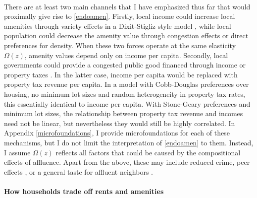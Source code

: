 \documentclass[12pt]{article}
\begin{document}
	 \paragraph*{}
	There are at least two main channels that I have emphasized thus far that would proximally give rise to \eqref{endoamen}. Firstly, local income could increase local amenities through variety effects in a Dixit-Stigliz style model \citep{AlmagroDI, Coutureetal}, while local population could decrease the amenity value through congestion effects or direct preferences for density. When these two forces operate at the same elasticity $\Omega(z)$, amenity values depend only on income per capita. Secondly, local governments could provide a congested public good financed through income or property taxes \citep{calabresetal, ineffTiebout}. In the latter case, income per capita would be replaced with property tax revenue per capita. In a model with Cobb-Douglas preferences over housing, no minimum lot sizes and random heterogeneity in property tax rates, this essentially identical to income per capita. With Stone-Geary preferences and minimum lot sizes, the relationship between property tax revenue and incomes need not be linear, but nevertheless they would still be highly correlated. In Appendix \ref{microfoundations}, I provide microfoundations for each of these mechanisms, but I do not limit the interpretation of \eqref{endoamen} to them. Instead, I assume $\Omega(z)$ reflects all factors that could be caused by the compositional effects of affluence. Apart from the above, these may include reduced crime, peer effects \citep{chettyhendren}, or a general taste for affluent neighbors \citep{ghh2013, parispoor}. 
	
	\paragraph*{How households trade off rents and amenities} 
	
\end{document}
